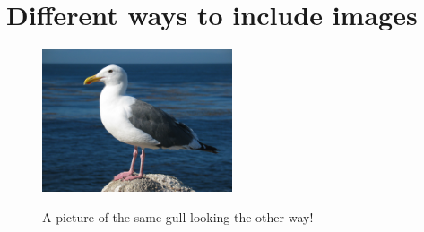 \documentclass[10pt, a4paper]{article}
\begin{document}
\listoffigures
\newpage
\section{Different ways to include images}


\begin{figure}[h]
\centering
  \includegraphics[width=0.5\textwidth]{gull_picture}
\end{figure}

\begin{figure}[h]
  \centering
  \caption{A picture of the same gull
           looking the other way!}
\end{figure}
\newpage
\end{document}
